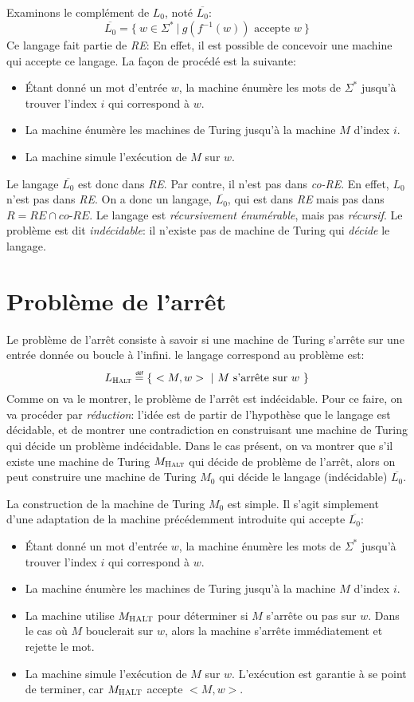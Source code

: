 Examinons le complément de $L_0$, noté $\overline{L_0}$:
\[
\overline{L_0} = \{\ w \in \Sigma^*\ |\ g(f^{-1}(w))\text{ accepte }w\ \}
\]
Ce langage fait partie de \textit{RE}: En effet, il est possible de concevoir une machine qui accepte ce langage.
La façon de procédé est la suivante:
\begin{itemize}
\item Étant donné un mot d'entrée $w$, la machine énumère les mots de $\Sigma^*$ jusqu'à trouver l'index $i$ qui correspond à $w$.
\item La machine énumère les machines de Turing jusqu'à la machine $M$ d'index $i$.
\item La machine simule l'exécution de $M$ sur $w$.
\end{itemize}
Le langage $\overline{L_0}$ est donc dans \textit{RE}.
Par contre, il n'est pas dans \textit{co-RE}.
En effet, $L_0$ n'est pas dans \textit{RE}.
On a donc un langage, $\overline{L_0}$, qui est dans \textit{RE} mais pas dans $\textit{R} = \textit{RE} \cap \textit{co-RE}$.
Le langage est \textit{récursivement énumérable}, mais pas \textit{récursif}.
Le problème est dit \textit{indécidable}: il n'existe pas de machine de Turing qui \textit{décide} le langage.

\section{Problème de l'arrêt}

Le problème de l'arrêt consiste à savoir si une machine de Turing s'arrête sur une entrée donnée ou boucle à l'infini. le langage correspond au problème est:
\[
L_\textsc{Halt} \eqdef \{\ <M, w>\ |\ M\text{ s'arrête sur }w\ \}
\]
Comme on va le montrer, le problème de l'arrêt est indécidable.
Pour ce faire, on va procéder par \textit{réduction}: l'idée est de partir de l'hypothèse que le langage est décidable, et de montrer une contradiction en construisant une machine de Turing qui décide un problème indécidable.
Dans le cas présent, on va montrer que s'il existe une machine de Turing $M_\textsc{Halt}$ qui décide de problème de l'arrêt, alors on peut construire une machine de Turing $M_0$ qui décide le langage (indécidable) $\overline{L_0}$.

La construction de la machine de Turing $M_0$ est simple. Il s'agit simplement d'une adaptation de la machine précédemment introduite qui accepte $\overline{L_0}$:
\begin{itemize}
\item Étant donné un mot d'entrée $w$, la machine énumère les mots de $\Sigma^*$ jusqu'à trouver l'index $i$ qui correspond à $w$.
\item La machine énumère les machines de Turing jusqu'à la machine $M$ d'index $i$.
\item La machine utilise $M_\textsc{HALT}$ pour déterminer si $M$ s'arrête ou pas sur $w$. Dans le cas où $M$ bouclerait sur $w$, alors la machine s'arrête immédiatement et rejette le mot.
\item La machine simule l'exécution de $M$ sur $w$. L'exécution est garantie à se point de terminer, car $M_\textsc{HALT}$ accepte $<M, w>$.
\end{itemize}

